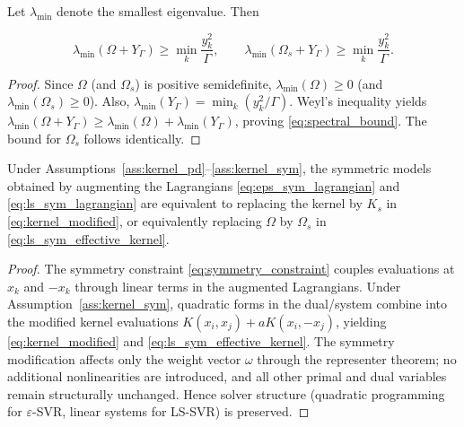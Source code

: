 \documentclass[mathematics,article,submit,pdftex,moreauthors]{Definitions/mdpi}
\begin{document}
\begin{Corollary}\label{cor:spectral_bound}
Let $\lambda_{\min}$ denote the smallest eigenvalue. Then
\begin{linenomath}
\begin{equation}\label{eq:spectral_bound}
\lambda_{\min}(\Omega+Y_\Gamma)\ge \min_k \frac{y_k^2}{\Gamma},
\qquad
\lambda_{\min}(\Omega_s+Y_\Gamma)\ge \min_k \frac{y_k^2}{\Gamma}.
\end{equation}
\end{linenomath}
\end{Corollary}

\begin{proof}
Since $\Omega$ (and $\Omega_s$) is positive semidefinite, $\lambda_{\min}(\Omega)\ge 0$ (and $\lambda_{\min}(\Omega_s) \geq 0$). 
Also, $\lambda_{\min}(Y_\Gamma)=\min_k (y_k^2/\Gamma)$. 
Weyl's inequality yields $\lambda_{\min}(\Omega+Y_\Gamma)\ge \lambda_{\min}(\Omega)+\lambda_{\min}(Y_\Gamma)$, 
proving \eqref{eq:spectral_bound}. The bound for $\Omega_s$ follows identically.
\end{proof}

\begin{Theorem}\label{thm:sym_kernel_equiv}
Under Assumptions~\ref{ass:kernel_pd}--\ref{ass:kernel_sym}, the symmetric models obtained by augmenting the Lagrangians
\eqref{eq:eps_sym_lagrangian} and \eqref{eq:ls_sym_lagrangian} are equivalent to replacing the kernel by $K_s$ in \eqref{eq:kernel_modified},
or equivalently replacing $\Omega$ by $\Omega_s$ in \eqref{eq:ls_sym_effective_kernel}.
\end{Theorem}

\begin{proof}
The symmetry constraint \eqref{eq:symmetry_constraint} couples evaluations at $x_k$ and $-x_k$ through linear terms in the augmented Lagrangians.
Under Assumption~\ref{ass:kernel_sym}, quadratic forms in the dual/system combine into the modified kernel evaluations
$K(x_i,x_j)+aK(x_i,-x_j)$, yielding \eqref{eq:kernel_modified} and \eqref{eq:ls_sym_effective_kernel}. 
The symmetry modification affects only the weight vector $\omega$ through the representer theorem; 
no additional nonlinearities are introduced, and all other primal and dual variables remain structurally unchanged. 
Hence solver structure (quadratic programming for $\varepsilon$-SVR, linear systems for LS-SVR) is preserved.
\end{proof}


\end{document}
